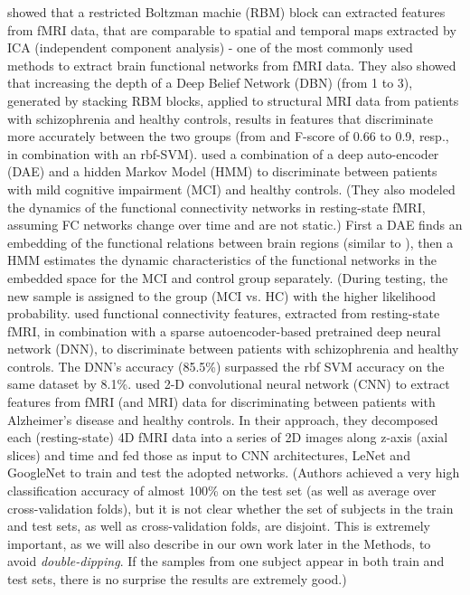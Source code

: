 \documentclass{article}
\begin{document}
\citet{Plis2014} showed that a restricted Boltzman machie (RBM) block \citep{Hinton2002} can extracted features from fMRI data, that are comparable to spatial and temporal maps extracted by ICA (independent component analysis) - one of the most commonly used methods to extract brain functional networks from fMRI data. They also showed that increasing the depth of a Deep Belief Network (DBN) \citep{Hinton2006} (from 1 to 3), generated by stacking RBM blocks, applied to structural MRI data from patients with schizophrenia and healthy controls, results in features that discriminate more accurately between the two groups (from and F-score of 0.66 to 0.9, resp., in combination with an rbf-SVM). \citet{Suk2016} used a combination of a deep auto-encoder (DAE) and a hidden Markov Model (HMM) to discriminate between patients with mild cognitive impairment (MCI) and healthy controls. (They also modeled the dynamics of the functional connectivity networks in resting-state fMRI, assuming FC networks change over time and are not static.) First a DAE finds an embedding of the functional relations between brain regions (similar to \citep{Plis2014}), then a HMM estimates the dynamic characteristics of the functional networks in the embedded space for the MCI and control group separately. (During testing, the new sample is assigned to the group (MCI vs. HC) with the higher likelihood probability. \citet{Kim2016} used functional connectivity features, extracted from resting-state fMRI, in combination with a sparse autoencoder-based pretrained deep neural network (DNN), to discriminate between patients with schizophrenia and healthy controls. The DNN's accuracy (85.5\%) surpassed the rbf SVM accuracy on the same dataset by 8.1\%. \citet{Sarraf2016} used 2-D convolutional neural network (CNN) to extract features from fMRI (and MRI) data for discriminating between patients with Alzheimer’s disease and healthy controls. In their approach, they decomposed each (resting-state) 4D fMRI data into a series of 2D images along z-axis (axial slices) and time and fed those as input to CNN architectures, LeNet \citep{Lecun1998} and GoogleNet \citep{Szegedy2015} to train and test the adopted networks. (Authors achieved a very high classification accuracy of almost 100\% on the test set (as well as average over cross-validation folds), but it is not clear whether the set of subjects in the train and test sets, as well as cross-validation folds, are disjoint. This is extremely important, as we will also describe in our own work later in the Methods, to avoid \textit{double-dipping}. If the samples from one subject appear in both train and test sets, there is no surprise the results are extremely good.)
\end{document}
